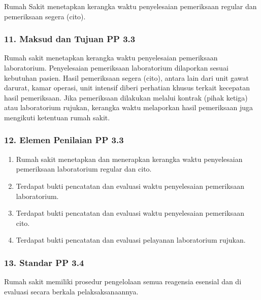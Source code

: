 \documentclass[
]{book}
\providecommand{\tightlist}{%
  \setlength{\itemsep}{0pt}\setlength{\parskip}{0pt}}
\begin{document}
Rumah Sakit menetapkan kerangka waktu penyelesaian pemeriksaan regular dan pemeriksaan segera (cito).

\hypertarget{maksud-dan-tujuan-pp-3.3}{%
\subsubsection*{11. Maksud dan Tujuan PP 3.3}\label{maksud-dan-tujuan-pp-3.3}}

Rumah sakit menetapkan kerangka waktu penyelesaian pemeriksaan laboratorium. Penyelesaian pemeriksaan laboratorium dilaporkan sesuai kebutuhan pasien. Hasil pemeriksaan segera (cito), antara lain dari unit gawat darurat, kamar operasi, unit intensif diberi perhatian khusus terkait kecepatan hasil pemeriksaan. Jika pemeriksaan dilakukan melalui kontrak (pihak ketiga) atau laboratorium rujukan, kerangka waktu melaporkan hasil pemeriksaan juga mengikuti ketentuan rumah sakit.

\hypertarget{elemen-penilaian-pp-3.3}{%
\subsubsection*{12. Elemen Penilaian PP 3.3}\label{elemen-penilaian-pp-3.3}}

\begin{enumerate}
\def\labelenumi{\alph{enumi}.}
\tightlist
\item
  Rumah sakit menetapkan dan menerapkan kerangka waktu penyelesaian pemeriksaan laboratorium regular dan cito.
\item
  Terdapat bukti pencatatan dan evaluasi waktu penyelesaian pemeriksaan laboratorium.
\item
  Terdapat bukti pencatatan dan evaluasi waktu penyelesaian pemeriksaan cito.
\item
  Terdapat bukti pencatatan dan evaluasi pelayanan laboratorium rujukan.
\end{enumerate}

\hypertarget{standar-pp-3.4}{%
\subsubsection*{13. Standar PP 3.4}\label{standar-pp-3.4}}

Rumah sakit memiliki prosedur pengelolaan semua reagensia esensial dan di evaluasi secara berkala pelaksaksanaannya.
\end{document}
